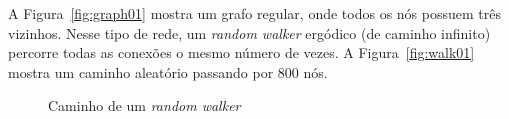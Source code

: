 \documentclass[12pt,a4paper]{article}
\begin{document}
A Figura~\ref{fig:graph01} mostra um grafo regular, onde todos os nós possuem três vizinhos. Nesse tipo de rede, um \textit{random walker} ergódico (de caminho infinito) percorre todas as conexões o mesmo número de vezes. A Figura~\ref{fig:walk01} mostra um caminho aleatório passando por 800 nós.

\begin{figure}[ht]
    \centering
    \caption{Caminho de um \textit{random walker}}
\end{figure}
\end{document}
